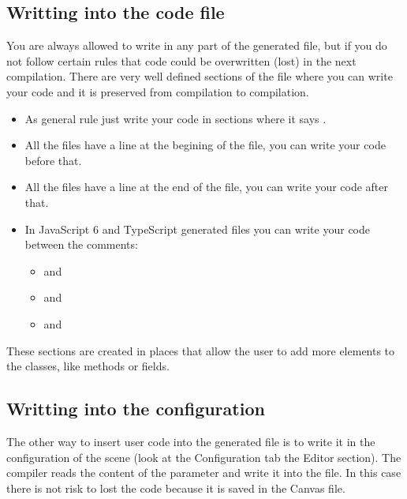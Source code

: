 \documentclass[letterpaper,10pt,english]{sphinxmanual}
\begin{document}
\subsection{Writting into the code file}
\label{\detokenize{canvas:writting-into-the-code-file}}
You are always allowed to write in any part of the generated file, but if you do not follow certain rules that code could be overwritten (lost) in the next compilation. There are very well defined sections of the file where you can write your code and it is preserved from compilation to compilation.
\begin{itemize}
\item {} 
As general rule just write your code in sections where it says .

\item {} 
All the files have a  line at the begining of the file, you can write your code before that.

\item {} 
All the files have a  line at the end of the file, you can write your code after that.

\item {} 
In JavaScript 6 and TypeScript generated files you can write your code between the comments:
\begin{itemize}
\item {} 
 and 

\item {} 
 and 

\item {} 
 and 

\end{itemize}

\end{itemize}

These sections are created in places that allow the user to add more elements to the classes, like methods or fields.


\subsection{Writting into the configuration}
\label{\detokenize{canvas:writting-into-the-configuration}}
The other way to insert user code into the generated file is to write it in the configuration of the scene (look at the Configuration tab the Editor section). The compiler reads the content of the  parameter and write it into the file. In this case there is not risk to lost the code because it is saved in the Canvas file.
\end{document}
